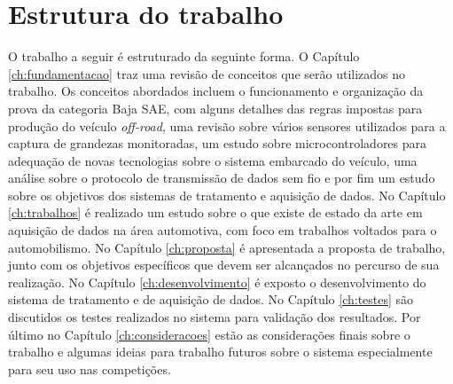 \section{Estrutura do trabalho}

O trabalho a seguir é estruturado da seguinte forma. O Capítulo \ref{ch:fundamentacao} traz uma revisão de conceitos que serão utilizados no trabalho. Os conceitos abordados incluem o funcionamento e organização da prova da categoria Baja SAE, com alguns detalhes das regras impostas para produção do veículo \textit{off-road}, uma revisão sobre vários sensores utilizados para a captura de grandezas monitoradas, um estudo sobre microcontroladores para adequação de novas tecnologias sobre o sistema embarcado do veículo, uma análise sobre o protocolo de transmissão de dados sem fio e por fim um estudo sobre os objetivos dos sistemas de tratamento e aquisição de dados. No Capítulo \ref{ch:trabalhos} é realizado um estudo sobre o que existe de estado da arte em aquisição de dados na área automotiva, com foco em trabalhos voltados para o automobilismo. No Capítulo \ref{ch:proposta} é apresentada a proposta de trabalho, junto com os objetivos específicos que devem ser alcançados no percurso de sua realização. No Capítulo \ref{ch:desenvolvimento} é exposto o desenvolvimento do sistema de tratamento e de aquisição de dados. No Capítulo \ref{ch:testes} são discutidos os testes realizados no sistema para validação dos resultados. Por último no Capítulo \ref{ch:consideracoes} estão as considerações finais sobre o trabalho e algumas ideias para trabalho futuros sobre o sistema especialmente para seu uso nas competições.  
